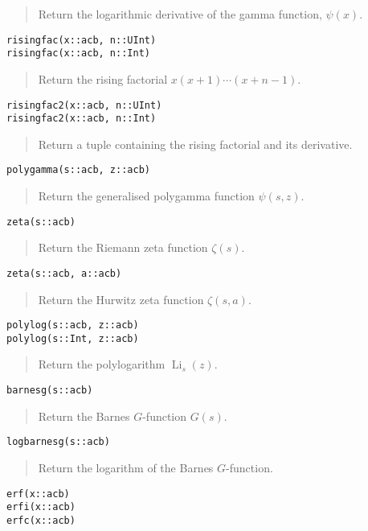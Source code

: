 \documentclass[a4paper,10pt]{article}
\newcommand{\desc}[1]{\vspace{-3mm}\begin{quote}#1\end{quote}}
\begin{document}
{{\desc{Return the logarithmic derivative of the gamma function, $\psi(x)$.}

\begin{lstlisting}
risingfac(x::acb, n::UInt)
risingfac(x::acb, n::Int)
\end{lstlisting}

\desc{Return the rising factorial $x (x+1) \cdots (x+n-1)$.}

\begin{lstlisting}
risingfac2(x::acb, n::UInt)
risingfac2(x::acb, n::Int)
\end{lstlisting}

\desc{Return a tuple containing the rising factorial and its derivative.}

\begin{lstlisting}
polygamma(s::acb, z::acb)
\end{lstlisting}

\desc{Return the generalised polygamma function $\psi(s,z)$.}

\begin{lstlisting}
zeta(s::acb)
\end{lstlisting}

\desc{Return the Riemann zeta function $\zeta(s)$.}

\begin{lstlisting}
zeta(s::acb, a::acb)
\end{lstlisting}

\desc{Return the Hurwitz zeta function $\zeta(s,a)$.}

\begin{lstlisting}
polylog(s::acb, z::acb)
polylog(s::Int, z::acb)
\end{lstlisting}

\desc{Return the polylogarithm $\operatorname{Li}_s(z)$.}

\begin{lstlisting}
barnesg(s::acb)
\end{lstlisting}

\desc{Return the Barnes $G$-function $G(s)$.}

\begin{lstlisting}
logbarnesg(s::acb)
\end{lstlisting}

\desc{Return the logarithm of the Barnes $G$-function.}

\begin{lstlisting}
erf(x::acb)
erfi(x::acb)
erfc(x::acb)
\end{lstlisting}

}}
\end{document}

